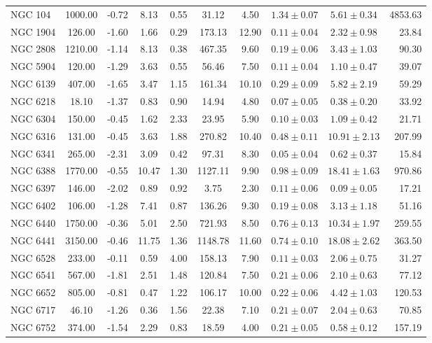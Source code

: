 \documentclass[doublespace,nopageskip]{VTthesis}
\begin{document}
\begin{table}
{\begin{tabular}{lccccccccr}
NGC 104 & 1000.00 & -0.72 & 8.13 & 0.55 & 31.12 & 4.50 & $1.34 \pm 0.07$ & $5.61 \pm 0.34$ & 4853.63\\
NGC 1904 & 126.00 & -1.60 & 1.66 & 0.29 & 173.13 & 12.90 & $0.11 \pm 0.04$ & $2.32 \pm 0.98$ & 23.84\\
NGC 2808 & 1210.00 & -1.14 & 8.13 & 0.38 & 467.35 & 9.60 & $0.19 \pm 0.06$ & $3.43 \pm 1.03$ & 90.30\\
NGC 5904 & 120.00 & -1.29 & 3.63 & 0.55 & 56.46 & 7.50 & $0.11 \pm 0.04$ & $1.10 \pm 0.47$ & 39.07\\
NGC 6139 & 407.00 & -1.65 & 3.47 & 1.15 & 161.34 & 10.10 & $0.29 \pm 0.09$ & $5.82 \pm 2.19$ & 59.29\\
NGC 6218 & 18.10 & -1.37 & 0.83 & 0.90 & 14.94 & 4.80 & $0.07 \pm 0.05$ & $0.38 \pm 0.20$ & 33.92\\
NGC 6304 & 150.00 & -0.45 & 1.62 & 2.33 & 23.95 & 5.90 & $0.10 \pm 0.03$ & $1.09 \pm 0.42$ & 21.71\\
NGC 6316 & 131.00 & -0.45 & 3.63 & 1.88 & 270.82 & 10.40 & $0.48 \pm 0.11$ & $10.91 \pm 2.13$ & 207.99\\
NGC 6341 & 265.00 & -2.31 & 3.09 & 0.42 & 97.31 & 8.30 & $0.05 \pm 0.04$ & $0.62 \pm 0.37$ & 15.84\\
NGC 6388 & 1770.00 & -0.55 & 10.47 & 1.30 & 1127.11 & 9.90 & $0.98 \pm 0.09$ & $18.41 \pm 1.63$ & 970.86\\
NGC 6397 & 146.00 & -2.02 & 0.89 & 0.92 & 3.75 & 2.30 & $0.11 \pm 0.06$ & $0.09 \pm 0.05$ & 17.21\\
NGC 6402 & 106.00 & -1.28 & 7.41 & 0.87 & 136.26 & 9.30 & $0.19 \pm 0.08$ & $3.13 \pm 1.18$ & 51.16\\
NGC 6440 & 1750.00 & -0.36 & 5.01 & 2.50 & 721.93 & 8.50 & $0.76 \pm 0.13$ & $10.34 \pm 1.97$ & 259.55\\
NGC 6441 & 3150.00 & -0.46 & 11.75 & 1.36 & 1148.78 & 11.60 & $0.74 \pm 0.10$ & $18.08 \pm 2.62$ & 363.50\\
NGC 6528 & 233.00 & -0.11 & 0.59 & 4.00 & 158.13 & 7.90 & $0.11 \pm 0.03$ & $2.06 \pm 0.75$ & 31.27\\
NGC 6541 & 567.00 & -1.81 & 2.51 & 1.48 & 120.84 & 7.50 & $0.21 \pm 0.06$ & $2.10 \pm 0.63$ & 77.12\\
NGC 6652 & 805.00 & -0.81 & 0.47 & 1.22 & 106.17 & 10.00 & $0.22 \pm 0.06$ & $4.42 \pm 1.03$ & 120.53\\
NGC 6717 & 46.10 & -1.26 & 0.36 & 1.56 & 22.38 & 7.10 & $0.21 \pm 0.07$ & $2.04 \pm 0.63$ & 70.85\\
NGC 6752 & 374.00 & -1.54 & 2.29 & 0.83 & 18.59 & 4.00 & $0.21 \pm 0.05$ & $0.58 \pm 0.12$ & 157.19\\

\end{tabular}}
\end{table}
\end{document}
